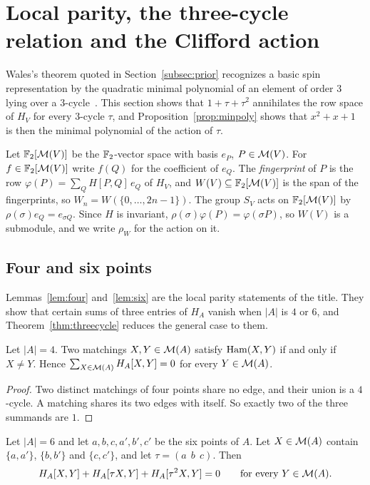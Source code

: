 \section{Local parity, the three-cycle relation and the Clifford action}\label{sec:threecycle}

Wales's theorem quoted in Section~\ref{subsec:prior} recognizes a basic spin representation by the quadratic minimal polynomial of an element of order $3$ lying over a $3$-cycle~\cite[Thm.~8.1]{Wales79}. This section shows that $1+\tau+\tau^2$ annihilates the row space of $H_V$ for every $3$-cycle $\tau$, and Proposition~\ref{prop:minpoly} shows that $x^2+x+1$ is then the minimal polynomial of the action of $\tau$.

Let $\mathbb{F}_2[\mathcal{M}(V)]$ be the $\mathbb{F}_2$-vector space with basis $e_P$, $P\in\mathcal{M}(V)$. For $f\in\mathbb{F}_2[\mathcal{M}(V)]$ write $f(Q)$ for the coefficient of $e_Q$. The \emph{fingerprint} of $P$ is the row $\varphi(P)=\sum_{Q}H[P,Q]\,e_Q$ of $H_V$, and $W(V)\subseteq\mathbb{F}_2[\mathcal{M}(V)]$ is the span of the fingerprints, so $W_n=W(\{0,\dots,2n-1\})$. The group $S_V$ acts on $\mathbb{F}_2[\mathcal{M}(V)]$ by $\rho(\sigma)e_Q=e_{\sigma Q}$. Since $H$ is invariant, $\rho(\sigma)\varphi(P)=\varphi(\sigma P)$, so $W(V)$ is a submodule, and we write $\rho_W$ for the action on it.

\subsection{Four and six points}

Lemmas~\ref{lem:four} and~\ref{lem:six} are the local parity statements of the title. They show that certain sums of three entries of $H_A$ vanish when $|A|$ is $4$ or $6$, and Theorem~\ref{thm:threecycle} reduces the general case to them.

\begin{lemma}\label{lem:four}
Let $|A|=4$. Two matchings $X,Y\in\mathcal{M}(A)$ satisfy $\operatorname{Ham}(X,Y)$ if and only if $X\ne Y$. Hence $\sum_{X\in\mathcal{M}(A)}H_A[X,Y]=0$ for every $Y\in\mathcal{M}(A)$.
\end{lemma}

\begin{proof}
Two distinct matchings of four points share no edge, and their union is a $4$-cycle. A matching shares its two edges with itself. So exactly two of the three summands are $1$.
\end{proof}

\begin{lemma}\label{lem:six}
Let $|A|=6$ and let $a,b,c,a',b',c'$ be the six points of $A$. Let $X\in\mathcal{M}(A)$ contain $\{a,a'\}$, $\{b,b'\}$ and $\{c,c'\}$, and let $\tau=(a\;\,b\;\,c)$. Then
\[
H_A[X,Y]+H_A[\tau X,Y]+H_A[\tau^{2}X,Y]=0\qquad\text{for every }Y\in\mathcal{M}(A).
\]
\end{lemma}

